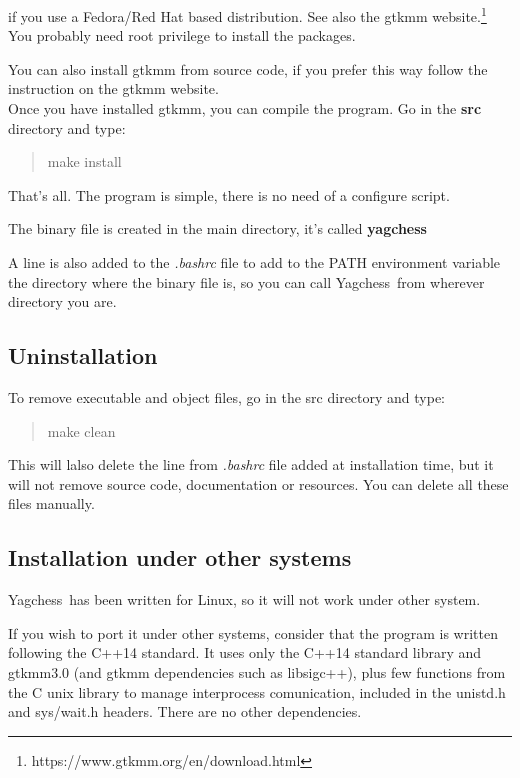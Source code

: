 \documentclass[a4paper]{article}
\newcommand{\nameprog}{Yagchess}
\begin{document}
if you use a Fedora/Red Hat based distribution. See also the gtkmm website.\footnote{https://www.gtkmm.org/en/download.html}
You probably need root privilege to install the packages.

You can also install gtkmm from source code, if you prefer this way follow the instruction on the gtkmm website.\\

Once you have installed gtkmm, you can compile the program. Go in the \textbf{src} directory and type:

\begin{quote}
make install
\end{quote}

That's all. The program is simple, there is no need of a configure script.

The binary file is created in the main directory, it's called \textbf{yagchess}

A line is also added to the \textit{.bashrc} file to add to the PATH environment variable the directory where the binary file is, so you can call \nameprog\ from wherever directory you are.


\subsection{Uninstallation}
To remove executable and object files, go in the src directory and type:

\begin{quote}
make clean
\end{quote}

This will lalso delete the line from \textit{.bashrc} file added at installation time, but it will not remove source code, documentation or resources. You can delete all these files manually.


\subsection{Installation under other systems}
\nameprog\ has been written for Linux, so it will not work under other system.

If you wish to port it under other systems, consider that the program is written following the C++14 standard. It uses only the C++14 standard library and gtkmm3.0
(and gtkmm dependencies such as libsigc++), plus few functions from the C unix library to manage interprocess comunication, included in the unistd.h and sys/wait.h headers.
There are no other dependencies.
\end{document}
